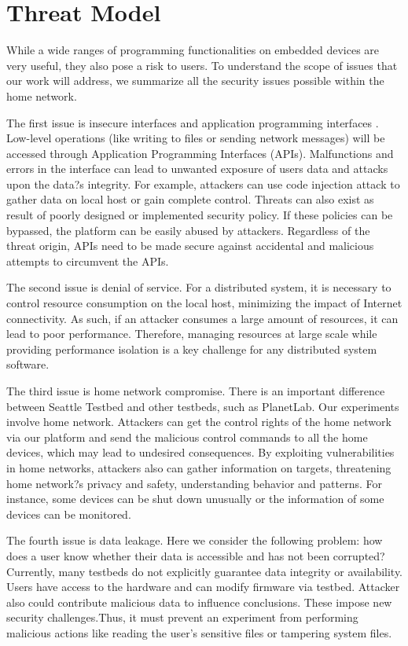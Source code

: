 \section{Threat Model}
\label{sec.threat_model}
While a wide ranges of programming functionalities on embedded devices are 
very useful, they also pose a risk to users. To understand the scope of 
issues that our work will address, we summarize all the security issues 
possible within the home network.

The first issue is insecure interfaces and application programming interfaces
. Low-level operations (like writing to files or sending network messages) 
will be accessed through Application Programming Interfaces (APIs). 
Malfunctions and errors in the interface can lead to unwanted exposure of 
users data and attacks upon the data?s integrity. For example, attackers can 
use code injection attack to gather data on local host or gain complete 
control. Threats can also exist as result of  poorly designed or implemented 
security policy. If these policies can be bypassed, the platform can be 
easily abused by attackers. Regardless of the threat origin, APIs need to be 
made secure against accidental and malicious attempts to circumvent the APIs.

The second issue is denial of service. For a distributed system, it is 
necessary to control resource consumption on the local host, minimizing the 
impact of Internet connectivity. As such, if an attacker consumes a large 
amount of resources, it can lead to poor performance. Therefore, managing 
resources at large scale while providing performance isolation is a key 
challenge for any distributed system software.

The third issue is home network compromise. There is an important difference 
between Seattle Testbed and other testbeds, such as PlanetLab. Our 
experiments involve home network. Attackers can get the control rights of 
the home network via our platform and send the malicious control commands to 
all the home devices, which may lead to undesired consequences. By 
exploiting vulnerabilities in home networks, attackers also can gather 
information on targets, threatening home network?s privacy and safety, 
understanding behavior and patterns. For instance, some devices can be shut 
down unusually or the information of some devices can be monitored.

The fourth issue is data leakage. Here we consider the following problem: 
how does a user know whether their data is accessible and has not been 
corrupted? Currently, many testbeds do not explicitly guarantee data 
integrity or availability. Users have access to the hardware and can modify 
firmware via testbed. Attacker also could contribute malicious data to 
influence conclusions. These impose new security challenges.Thus, it must 
prevent an experiment from performing malicious actions like reading the 
user's sensitive files or tampering system files.